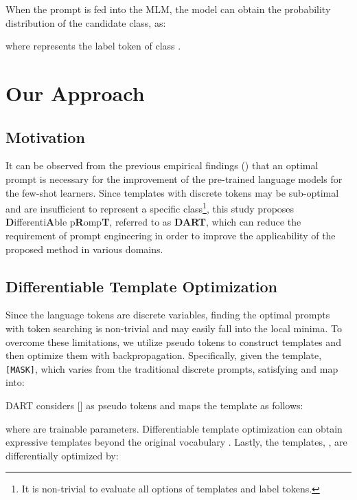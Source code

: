 \documentclass{article} \usepackage{iclr2022_conference,times}
\newcommand{\mask}{\texttt{[MASK]}}
\begin{document}
When the prompt is fed into the MLM, the model can obtain the probability distribution   of the candidate class,  as:

where  represents the  label token of class . 



\section{Our Approach}

\subsection{Motivation}

It can be observed from the previous empirical findings (\cite{DBLP:journals/corr/abs-2012-15723,DBLP:journals/corr/abs-2103-08493}) that an optimal prompt is necessary for the improvement of the pre-trained language models for the few-shot learners. 
Since templates with discrete tokens may be sub-optimal and are insufficient to represent a specific class\footnote{It is non-trivial to evaluate all options of templates and label tokens.}, this study proposes \textbf{D}ifferenti\textbf{A}ble p\textbf{R}omp\textbf{T}, referred to as {\textbf{DART}}, which can reduce the requirement of prompt engineering in order to improve the applicability of the proposed method in various domains.

\subsection{Differentiable Template Optimization}
\label{optsec1}

Since the language tokens are discrete variables, finding the optimal prompts with token searching is non-trivial and may easily fall into the local minima.
To overcome these limitations, we utilize pseudo tokens to construct templates and then optimize them with backpropagation.
Specifically, given the template,
\mask, which varies from  the traditional discrete prompts, satisfying  and map  into:



DART considers [] as pseudo tokens and maps the template as follows:



where  are trainable parameters. 
Differentiable template optimization can obtain expressive templates beyond the original vocabulary .
Lastly, the templates, , are differentially optimized by:
\end{document}
